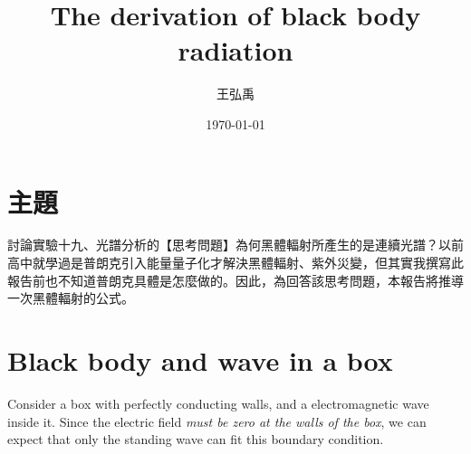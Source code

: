 \documentclass[12pt, a4paper]{article}
\title{\textbf{The derivation of black body radiation}}
\author{王弘禹}
\date\today
\begin{document}
\begin{CJK*}{UTF8}{bsmi}
\linespread{1.5}
\maketitle
\newcommand{\st}[1]{\section*{#1}}
\newcommand{\sst}[1]{\subsection*{#1}}
\newcommand{\ssst}[1]{\subsubsection*{#1}}
\newcommand{\dsp}{\displaystyle}
\newcommand{\dx}{\,dx}
\newcommand{\dphi}{\,d\phi}
\newcommand{\dtheta}{\,d\theta}
\newcommand{\dy}{\,dy}
\newcommand{\dz}{\,dz}
\newcommand{\dr}{\,dr}
\newcommand{\drho}{\,d\rho}
\newcommand{\tb}{\textbf}

\st{主題}
討論實驗十九、光譜分析的【思考問題】為何黑體輻射所產生的是連續光譜？以前高中就學過是普朗克引入能量量子化才解決黑體輻射、紫外災變，但其實我撰寫此報告前也不知道普朗克具體是怎麼做的。因此，為回答該思考問題，本報告將推導一次黑體輻射的公式。
\st{Black body and wave in a box}
Consider a box with perfectly conducting walls, and a electromagnetic wave inside it. Since the electric field \emph{must be zero at the walls of the box}, we can expect that only the standing wave can fit this boundary condition.


\end{CJK*}
\end{document}

